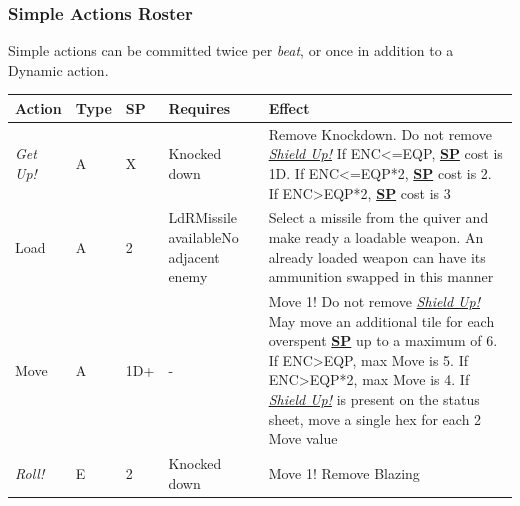 \documentclass[12pt]{article}
\newcommand{\refto}[1]{\hyperlink{#1}{\textbf{#1}}}
\newcommand{\reftoit}[1]{\hyperlink{#1}{\emph{#1}}}
\begin{document}
\renewcommand{\arraystretch}{1.5}

\subsubsection{Simple Actions Roster}
Simple actions can be committed twice per \emph{beat}, or once in addition to a Dynamic action.\\

\begin{center}
\begin{tabularx}{\textwidth}{p{}p{}p{}p{}p{}}
\hline
\rowcolor{white} \textbf{Action} & \textbf{Type} & \textbf{SP} & \textbf{Requires} & \textbf{Effect}\setcounter{rownum}{0}\\
\hline
\emph{Get Up!} & A & X & Knocked down & Remove Knockdown.\newline
Do not remove \reftoit{Shield Up!}\newline
If ENC<=EQP, \refto{SP} cost is 1D.\newline
If ENC<=EQP*2, \refto{SP} cost is 2.\newline
If ENC>EQP*2, \refto{SP} cost is 3\\
Load & A & 2 & LdR\newline Missile available\newline No adjacent enemy & Select a missile from the quiver and make ready a loadable weapon. An already loaded weapon can have its ammunition swapped in this manner\\
Move & A & 1D+ & - & Move 1!\newline
Do not remove \reftoit{Shield Up!}\newline
May move an additional tile for each overspent \refto{SP} up to a maximum of 6.\newline
If ENC>EQP, max Move is 5.\newline
If ENC>EQP*2, max Move is 4.\newline
If \reftoit{Shield Up!} is present on the status sheet, move a single hex for each 2 Move value\setcounter{rownum}{0}\\
\rowcolor{white} \emph{Roll!} & E & 2 & Knocked down & Move 1!\newline
Remove Blazing\\
\hline
\end{tabularx}
\end{center}

\pagebreak
\end{document}
